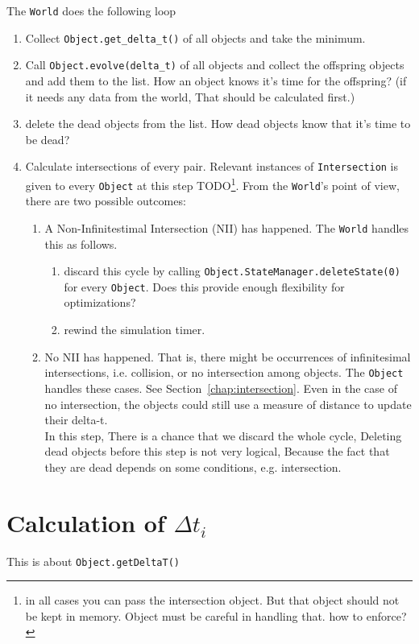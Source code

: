 \documentclass[a4paper]{report}
\newcommand{\cm}[1]{{\color{red}#1}}
\newcommand{\ai}[1]{{\color{blue}#1}}
\begin{document}
The \verb+World+ does the following loop
\begin{enumerate}
	\item Collect \verb+Object.get_delta_t()+ of all objects and take the minimum.
	\item Call \verb+Object.evolve(delta_t)+ of all objects and collect the offspring objects and add them to the list.
	\cm{How an object knows it's time for the offspring? (if it needs any data from the world, That should be calculated first.)}
	\item delete the dead objects from the list.
	\cm{How dead objects know that it's time to be dead?}
	\item Calculate intersections of every pair. Relevant instances of \verb+Intersection+ is given to every \verb+Object+ at this step TODO\footnote{\ai{in all cases you can pass the intersection object. But that object should not be kept in memory. Object must be careful in handling that. how to enforce?}}. From the \verb+World+'s point of view, there are two possible outcomes:
	\begin{enumerate}
		\item A Non-Infinitestimal Intersection (NII) has happened. The \verb+World+ handles this as follows. 
		\begin{enumerate}
			\item discard this cycle by calling \verb+Object.StateManager.deleteState(0)+ for every \verb+Object+. \cm{Does this provide enough flexibility for optimizations?}
			\item rewind the simulation timer.
		\end{enumerate}
		\item No NII has happened. That is, there might be occurrences of infinitesimal intersections, i.e. collision, or no intersection among objects. The \verb+Object+ handles these cases. See Section~\ref{chap:intersection}. \cm{Even in the case of no intersection, the objects could still use a measure of distance to update their delta-t.}\\
		\cm{In this step, There is a chance that we discard the whole cycle, Deleting dead objects before this step is not very logical, Because the fact that they are dead depends on some conditions, e.g. intersection. }
	\end{enumerate}
\end{enumerate}

\section{Calculation of $\Delta t_i$}
This is about \verb+Object.getDeltaT()+
\end{document}
